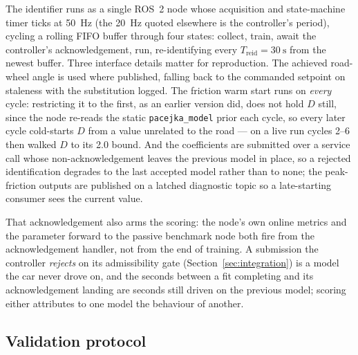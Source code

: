 The identifier runs as a single ROS~2 node whose acquisition and state-machine
timer ticks at \SI{50}{\hertz} (the \SI{20}{\hertz} quoted elsewhere is the
controller's period), cycling a rolling FIFO buffer through four states:
collect, train, await the controller's acknowledgement, run, re-identifying
every $T_{\mathrm{reid}}=\SI{30}{\second}$ from the newest buffer. Three
interface details matter for reproduction. The achieved road-wheel angle is
used where published, falling back to the commanded setpoint on staleness with
the substitution logged. The friction warm start runs on \emph{every} cycle:
restricting it to the first, as an earlier version did, does not hold $D$
still, since the node re-reads the static \texttt{pacejka\_model} prior each
cycle, so every later cycle cold-starts $D$ from a value unrelated to the road
--- on a live run cycles 2--6 then walked $D$ to its \num{2.0} bound. And the
coefficients are submitted over a service call whose non-acknowledgement leaves
the previous model in place, so a rejected identification degrades to the last
accepted model rather than to none; the peak-friction outputs are published on
a latched diagnostic topic so a late-starting consumer sees the current value.

That acknowledgement also arms the scoring: the node's own online metrics and
the parameter forward to the passive benchmark node both fire from the
acknowledgement handler, not from the end of training. A submission the
controller \emph{rejects} on its admissibility gate
(Section~\ref{sec:integration}) is a model the car never drove on, and the
seconds between a fit completing and its acknowledgement landing are seconds
still driven on the previous model; scoring either attributes to one model the
behaviour of another.

\subsection{Validation protocol}
\label{subsec:validation}

